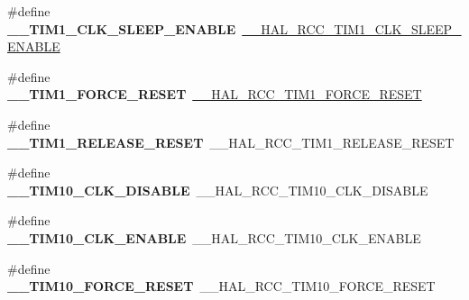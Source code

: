 \begin{DoxyCompactItemize}
\#define {\bfseries \+\_\+\+\_\+\+T\+I\+M1\+\_\+\+C\+L\+K\+\_\+\+S\+L\+E\+E\+P\+\_\+\+E\+N\+A\+B\+LE}~\mbox{\hyperlink{group___r_c_c_ex___peripheral___clock___sleep___enable___disable_ga6ce02f1b2689c664010bebc2363d1db4}{\+\_\+\+\_\+\+H\+A\+L\+\_\+\+R\+C\+C\+\_\+\+T\+I\+M1\+\_\+\+C\+L\+K\+\_\+\+S\+L\+E\+E\+P\+\_\+\+E\+N\+A\+B\+LE}}
\item 
\mbox{\label{group___h_a_l___r_c_c___aliased_ga42e9934d811e4a1eb3e1315ced3f9616}} 
\#define {\bfseries \+\_\+\+\_\+\+T\+I\+M1\+\_\+\+F\+O\+R\+C\+E\+\_\+\+R\+E\+S\+ET}~\mbox{\hyperlink{group___r_c_c_ex___force___release___peripheral___reset_gac423d6a52fa42423119844e4a7d68c7b}{\+\_\+\+\_\+\+H\+A\+L\+\_\+\+R\+C\+C\+\_\+\+T\+I\+M1\+\_\+\+F\+O\+R\+C\+E\+\_\+\+R\+E\+S\+ET}}
\item 
\mbox{\label{group___h_a_l___r_c_c___aliased_ga11d22b1ab7d4d7b9e21f70feca19d595}} 
\#define {\bfseries \+\_\+\+\_\+\+T\+I\+M1\+\_\+\+R\+E\+L\+E\+A\+S\+E\+\_\+\+R\+E\+S\+ET}~\+\_\+\+\_\+\+H\+A\+L\+\_\+\+R\+C\+C\+\_\+\+T\+I\+M1\+\_\+\+R\+E\+L\+E\+A\+S\+E\+\_\+\+R\+E\+S\+ET
\item 
\mbox{\label{group___h_a_l___r_c_c___aliased_ga6015db503657bee4d141974992681af4}} 
\#define {\bfseries \+\_\+\+\_\+\+T\+I\+M10\+\_\+\+C\+L\+K\+\_\+\+D\+I\+S\+A\+B\+LE}~\+\_\+\+\_\+\+H\+A\+L\+\_\+\+R\+C\+C\+\_\+\+T\+I\+M10\+\_\+\+C\+L\+K\+\_\+\+D\+I\+S\+A\+B\+LE
\item 
\mbox{\label{group___h_a_l___r_c_c___aliased_gaaede2703ebcc0edcfe2508364b465ba2}} 
\#define {\bfseries \+\_\+\+\_\+\+T\+I\+M10\+\_\+\+C\+L\+K\+\_\+\+E\+N\+A\+B\+LE}~\+\_\+\+\_\+\+H\+A\+L\+\_\+\+R\+C\+C\+\_\+\+T\+I\+M10\+\_\+\+C\+L\+K\+\_\+\+E\+N\+A\+B\+LE
\item 
\mbox{\label{group___h_a_l___r_c_c___aliased_ga51608836d363e8f56bcd43ef9846cec4}} 
\#define {\bfseries \+\_\+\+\_\+\+T\+I\+M10\+\_\+\+F\+O\+R\+C\+E\+\_\+\+R\+E\+S\+ET}~\+\_\+\+\_\+\+H\+A\+L\+\_\+\+R\+C\+C\+\_\+\+T\+I\+M10\+\_\+\+F\+O\+R\+C\+E\+\_\+\+R\+E\+S\+ET
\item 
\mbox{\label{group___h_a_l___r_c_c___aliased_ga69408398d8d314c1ad20868dc155bd1a}} 

\end{DoxyCompactItemize}

